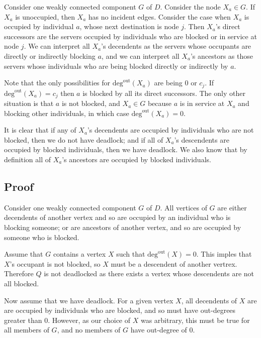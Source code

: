 \documentclass{article}
\begin{document}
Consider one weakly connected component $G$ of $D$.
Consider the node $X_a \in G$. If $X_a$ is unoccupied, then $X_a$ has no incident edges.
Consider the case when $X_a$ is occupied by individual $a$, whose next destination is node $j$.
Then $X_a$'s direct successors are the  servers occupied by individuals who are blocked or in service at node $j$.
We can interpret all $X_a$'s decendents as the servers whose occupants are directly or indirectly blocking $a$, and we can interpret all $X_a$'s ancestors as those servers whose individuals who are being blocked directly or indirectly by $a$.\newline

Note that the only possibilities for $\text{deg}^{\text{out}}(X_a)$ are being 0 or $c_j$.
If $\text{deg}^{\text{out}}(X_a) = c_j$ then $a$ is blocked by all its direct successors.
The only other situation is that $a$ is not blocked, and $X_a \in G$ because $a$ is in service at $X_a$ and blocking other individuals, in which case $\text{deg}^{\text{out}}(X_a) = 0$.\newline

It is clear that if any of $X_a$'s decendents are occupied by individuals who are not blocked, then we do not have deadlock; and if all of $X_a$'s descendents are occupied by blocked individuals, then we have deadlock.
We also know that by definition all of $X_a$'s ancestors are occupied by blocked individuals.\newline

\subsection*{Proof}

Consider one weakly connected component $G$ of $D$.
All vertices of $G$ are either decendents of another vertex and so are occupied by an individual who is blocking someone; or are ancestors of another vertex, and so are occupied by someone who is blocked.\newline

Assume that $G$ contains a vertex $X$ such that $\text{deg}^{\text{out}}(X) = 0$.
This imples that $X$'s occupant is not blocked, so $X$ must be a descendent of another vertrex.
Therefore $Q$ is not deadlocked as there exists a vertex whose descendents are not all blocked.\newline

Now assume that we have deadlock.
For a given vertex $X$, all decendents of $X$ are are occupied by individuals who are blocked, and so must have out-degrees greater than 0.
However, as our choice of $X$ was arbitrary, this must be true for all members of $G$, and no members of $G$ have out-degree of 0.\newline



\end{document}

